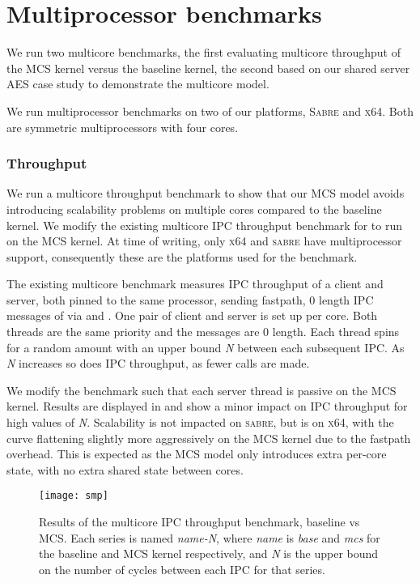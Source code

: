\section{Multiprocessor benchmarks}

We run two multicore benchmarks, the first evaluating multicore throughput of the MCS kernel versus the
baseline kernel, the second based on our shared server \gls{AES} case study to demonstrate the
multicore model. 

We run multiprocessor benchmarks on two of our platforms, \textsc{Sabre} and \textsc{x64}. Both 
are symmetric multiprocessors with four cores. 

\subsubsection{Throughput}

We run a multicore throughput benchmark to show that our MCS model
avoids introducing scalability problems on multiple cores compared to the baseline kernel.
We modify the
existing multicore IPC throughput benchmark for \selfour to run on the MCS kernel. 
At time of writing, only \textsc{x64} and \textsc{sabre} have \selfour multiprocessor support, 
consequently these are the platforms used for the benchmark.

The existing multicore benchmark measures IPC throughput of a client and server, both 
pinned to the same processor, sending fastpath, 0 length IPC messages of via \call
and \replyrecv. One pair of client and server is set up per core. Both threads are
the same priority and the messages are 0 length. Each thread spins for a random amount
with an upper bound \textit{N} between each subsequent IPC. As \textit{N} increases so does
IPC throughput, as fewer calls are made.

We modify the benchmark such that each server thread is passive on the MCS kernel.
Results are displayed in  and show a minor impact on IPC throughput
for high values of \textit{N}. Scalability is not impacted on \textsc{sabre}, but is on \textsc{x64},
with the curve flattening slightly more aggressively on the MCS kernel
due to the fastpath overhead. This is expected as the MCS model only introduces extra 
per-core state, with no extra shared state between cores.

\begin{figure}[ht] 
    \centering
    \texttt{[image: smp]}
    \caption{Results of the multicore IPC throughput benchmark, baseline \selfour vs MCS. 
        Each series is named \textit{name-N}, where \textit{name} is \textit{base} and \textit{mcs} for 
        the baseline and MCS kernel respectively, and \textit{N} is the upper
        bound on the number of cycles between each IPC for that series.}
    \label{f:evaluation-smp}
\end{figure}

